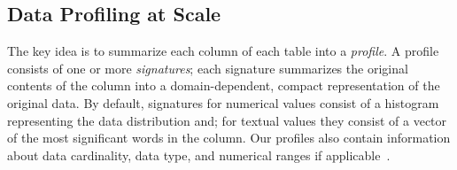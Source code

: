 \subsection{Data Profiling at Scale}

The key idea is to summarize each column of each table into a {\em profile}.
A profile consists of one or more {\it signatures};  each signature summarizes
the original contents of the column into a domain-dependent, compact
representation of the original data.  By default, signatures for numerical values consist of a
histogram representing the data distribution and; for textual values they consist of a vector
of the most significant words in the column.  Our profiles also
contain information about data cardinality, data type, and numerical ranges if
applicable~\cite{profiling_survey}.


